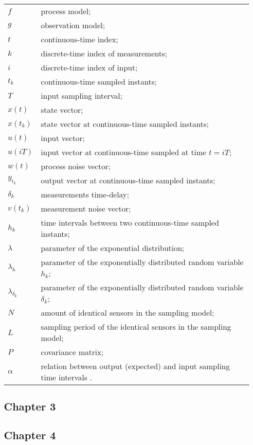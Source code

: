 \begin{longtable}{ll}
	$f$						& process model; \\
	$g$						& observation model; \\
	$t$						& continuous-time index; \\
	$k$						& discrete-time index of measurements; \\
	$i$						& discrete-time index of input; \\
	$t_k$					& continuous-time sampled instants; \\
	$T$						& input sampling interval; \\
	$x(t)$					& state vector; \\
	$x(t_k)$				& state vector at continuous-time sampled instants; \\
	$u(t)$					& input vector; \\
	$u(iT)$					& input vector at continuous-time sampled at time $t = iT$; \\						
	$w(t)$					& process noise vector; \\
	$y_{t_k}$            	& output vector at continuous-time sampled instants;\\
	$\delta_{k}$			& measurements time-delay; \\
	$v(t_k)$				& measurement noise vector; \\
	$h_k$					& time intervals between two continuous-time sampled instants; \\
	$\lambda$ 				& parameter of the exponential distribution; \\
	$\lambda_h$				& parameter of the exponentially distributed random variable $h_k$; \\
	$\lambda_{\delta_{k}}$	& parameter of the exponentially distributed random variable $\delta_{k}$; \\
	$N$						& amount of identical sensors in the sampling model; \\
	$L$						& sampling period of the identical sensors in the sampling model; \\
	$P$						& covariance matrix; \\
	$\alpha$				& relation between output (expected) and input sampling time intervals . \\
\end{longtable}


\subsection*{Chapter 3}

\subsection*{Chapter 4}


